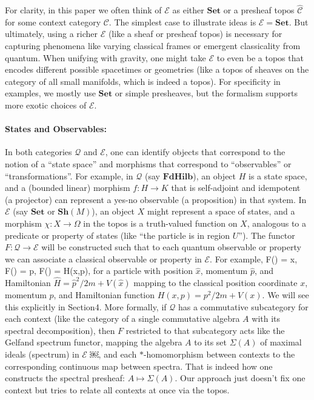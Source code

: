 For clarity, in this paper we often think of $\mathcal{E}$ as either $\mathbf{Set}$ or a presheaf topos $\widehat{\mathcal{C}}$ for some context category $\mathcal{C}$. The simplest case to illustrate ideas is $\mathcal{E}=\mathbf{Set}$. But ultimately, using a richer $\mathcal{E}$ (like a sheaf or presheaf topos) is necessary for capturing phenomena like varying classical frames or emergent classicality from quantum. When unifying with gravity, one might take $\mathcal{E}$ to even be a topos that encodes different possible spacetimes or geometries (like a topos of sheaves on the category of all small manifolds, which is indeed a topos). For specificity in examples, we mostly use $\mathbf{Set}$ or simple presheaves, but the formalism supports more exotic choices of $\mathcal{E}$.

\paragraph{States and Observables:} In both categories $\mathcal{Q}$ and $\mathcal{E}$, one can identify objects that correspond to the notion of a “state space” and morphisms that correspond to “observables” or “transformations”. For example, in $\mathcal{Q}$ (say $\mathbf{FdHilb}$), an object $H$ is a state space, and a (bounded linear) morphism $f: H \to K$ that is self-adjoint and idempotent (a projector) can represent a yes-no observable (a proposition) in that system. In $\mathcal{E}$ (say $\mathbf{Set}$ or $\mathbf{Sh}(M)$), an object $X$ might represent a space of states, and a morphism $\chi: X \to \Omega$ in the topos is a truth-valued function on $X$, analogous to a predicate or property of states (like “the particle is in region $U$”). The functor $F: \mathcal{Q}\to\mathcal{E}$ will be constructed such that to each quantum observable or property we can associate a classical observable or property in $\mathcal{E}$. For example,
F() = x, \quad F() = p, \quad F() = H(x,p),
for a particle with position $\hat{x}$, momentum $\hat{p}$, and Hamiltonian $\hat{H} = \hat{p}^2/2m + V(\hat{x})$ mapping to the classical position coordinate $x$, momentum $p$, and Hamiltonian function $H(x,p) = p^2/2m + V(x)$. We will see this explicitly in Section4. More formally, if $\mathcal{Q}$ has a commutative subcategory for each context (like the category of a single commutative algebra $A$ with its spectral decomposition), then $F$ restricted to that subcategory acts like the Gelfand spectrum functor, mapping the algebra $A$ to its set $\Sigma(A)$ of maximal ideals (spectrum) in $\mathcal{E}$ ￼, and each $*$-homomorphism between contexts to the corresponding continuous map between spectra. That is indeed how one constructs the spectral presheaf: $A \mapsto \Sigma(A)$. Our approach just doesn’t fix one context but tries to relate all contexts at once via the topos.

